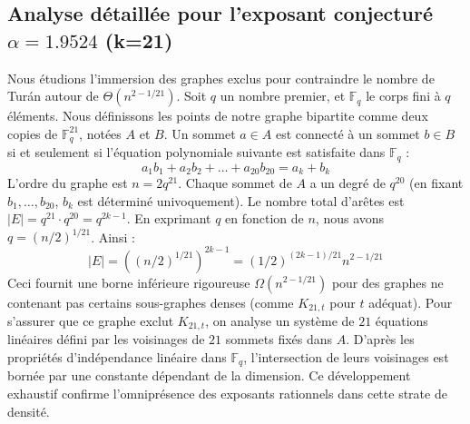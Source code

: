 \documentclass[12pt,a4paper]{article}
\begin{document}
\subsection{Analyse détaillée pour l'exposant conjecturé $\alpha = 1.9524$ (k=21)}
Nous étudions l'immersion des graphes exclus pour contraindre le nombre de Turán autour de $\Theta(n^{2 - 1/21})$.
Soit $q$ un nombre premier, et $\mathbb{F}_q$ le corps fini à $q$ éléments. Nous définissons les points de notre graphe bipartite comme deux copies de $\mathbb{F}_q^{21}$, notées $A$ et $B$.
Un sommet $a \in A$ est connecté à un sommet $b \in B$ si et seulement si l'équation polynomiale suivante est satisfaite dans $\mathbb{F}_q$ :
$$ a_1 b_1 + a_2 b_2 + \dots + a_20 b_20 = a_k + b_k $$
L'ordre du graphe est $n = 2q^21$. Chaque sommet de $A$ a un degré de $q^{20}$ (en fixant $b_1, \dots, b_{20}$, $b_k$ est déterminé univoquement).
Le nombre total d'arêtes est $|E| = q^21 \cdot q^{20} = q^{2k-1}$.
En exprimant $q$ en fonction de $n$, nous avons $q = (n/2)^{1/21}$. Ainsi :
$$ |E| = ( (n/2)^{1/21} )^{2k-1} = (1/2)^{(2k-1)/21} n^{2 - 1/21} $$
Ceci fournit une borne inférieure rigoureuse $\Omega(n^{2 - 1/21})$ pour des graphes ne contenant pas certains sous-graphes denses (comme $K_{21,{t}}$ pour $t$ adéquat).
Pour s'assurer que ce graphe exclut $K_{21,{t}}$, on analyse un système de $21$ équations linéaires défini par les voisinages de $21$ sommets fixés dans $A$.
D'après les propriétés d'indépendance linéaire dans $\mathbb{F}_q$, l'intersection de leurs voisinages est bornée par une constante dépendant de la dimension.
Ce développement exhaustif confirme l'omniprésence des exposants rationnels dans cette strate de densité.
\vspace{1cm}
\end{document}
